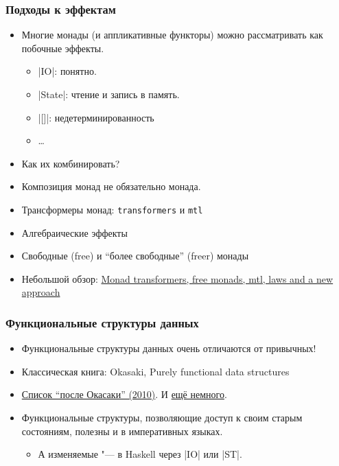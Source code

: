 \documentclass[11pt]{beamer}
\begin{document}
\begin{frame}[fragile]
  \frametitle{Подходы к эффектам}
  \begin{itemize}
    \item Многие монады (и аппликативные функторы) можно рассматривать как побочные эффекты.
          \begin{itemize}
            \item \haskinline|IO|: понятно.
            \item \haskinline|State|: чтение и запись в память.
            \item \haskinline|[]|: недетерминированность
            \item \ldots
          \end{itemize}
          \pause
    \item Как их комбинировать?
    \item Композиция монад не обязательно монада.
          \pause
    \item Трансформеры монад: \lstinline|transformers| и \lstinline|mtl|
    \item Алгебраические эффекты
    \item Свободные (free) и \enquote{более свободные} (freer) монады
    \item Небольшой обзор: \href{https://ocharles.org.uk/posts/2016-01-26-transformers-free-monads-mtl-laws.html}{Monad transformers, free monads, mtl, laws and a new approach}
  \end{itemize}
\end{frame}

\begin{frame}[fragile]
  \frametitle{Функциональные структуры данных}
  \begin{itemize}
    \item Функциональные структуры данных очень отличаются от привычных!
    \item Классическая книга: Okasaki, Purely functional data structures
    \item \href{https://cstheory.stackexchange.com/questions/1539/whats-new-in-purely-functional-data-structures-since-okasaki}{Список \enquote{после Окасаки} (2010)}. И \href{https://www.reddit.com/r/haskell/comments/a4wk1i/seminal_works_after_purely_functional_data/ebm30ra/}{ещё немного}.
          \pause
    \item Функциональные структуры, позволяющие доступ к своим старым состояниям, полезны и в императивных языках.
          \begin{itemize}
            \item А изменяемые "--- в Haskell через \haskinline|IO| или \haskinline|ST|.
          \end{itemize}
  \end{itemize}
\end{frame}
\end{document}
